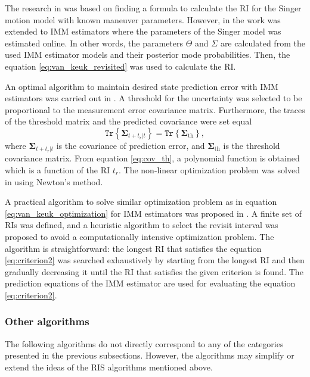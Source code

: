 \documentclass[english, 12pt, a4paper, elec, utf8, a-1b, online]{aaltothesis}
\renewcommand{\vec}[1]{\mathbf{#1}}
\newcommand{\tr}[1]{\texttt{Tr}\left\{ #1 \right\}}
\newcommand{\ri}{t_r}
\begin{document}
The research in \cite{Keuk1975, vanKeuk1993} was based on finding a formula to calculate the RI for the Singer motion model with known maneuver parameters.
However, in \cite{Shin1995} the work was extended to IMM estimators where the parameters of the Singer model was estimated online.
In other words, the parameters $\Theta$ and $\Sigma$ are calculated from the used IMM estimator models and their posterior mode probabilities.
Then, the equation \ref{eq:van_keuk_revisited} was used to calculate the RI.

An optimal algorithm to maintain desired state prediction error with IMM estimators was carried out in \cite{Watson1993}.
A threshold for the uncertainty was selected to be proportional to the measurement error covariance matrix.
Furthermore, the traces of the threshold matrix and the predicted covariance were set equal
\begin{equation}\label{eq:cov_th}
    \tr{ \vec{\Sigma}_{t+\ri|t} } = \tr{ \vec{\Sigma}_{\text{th}} },
\end{equation}
where $\vec{\Sigma}_{t+\ri|t}$ is the covariance of prediction error, and $\vec{\Sigma}_{\text{th}}$ is the threshold covariance matrix.
From equation \eqref{eq:cov_th}, a polynomial function is obtained which is a function of the RI $\ri$.
The non-linear optimization problem was solved in \cite{Watson1993} using Newton's method.

A practical algorithm to solve similar optimization problem as in equation \eqref{eq:van_keuk_optimization} for IMM estimators was proposed in \cite{Daeipour1994}. A finite set of RIs was defined, and a heuristic algorithm to select the revisit interval was proposed to avoid a computationally intensive optimization problem.
The algorithm is straightforward: the longest RI that satisfies the equation \eqref{eq:criterion2} was searched exhaustively by starting from the longest RI and then gradually decreasing it until the RI that satisfies the given criterion is found. 
The prediction equations of the IMM estimator are used for evaluating the equation \eqref{eq:criterion2}.

\subsubsection{Other algorithms}

The following algorithms do not directly correspond to any of the categories presented in the previous subsections.
However, the algorithms may simplify or extend the ideas of the RIS algorithms mentioned above.
\end{document}
